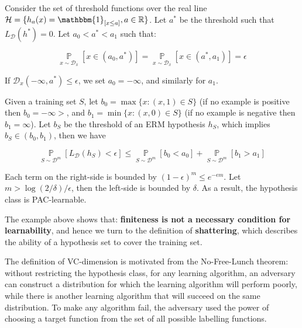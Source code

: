\documentclass{article}
\begin{document}
Consider the set of threshold functions over the real line $\mathcal{H}=\{h_a(x)=\mathbbm{1}_{[x\leq a]},a\in\mathbb{R}\}$. Let $a^*$ be the threshold such that $L_\mathcal{D}(h^*)=0$. Let $a_0<a^*<a_1$ such that:

\begin{equation*}
\mathop{\mathbb{P}}\limits_{x\sim\mathcal{D}_x}[x\in(a_0,a^*)]=\mathop{\mathbb{P}}\limits_{x\sim\mathcal{D}_x}[x\in(a^*,a_1)]=\epsilon
\end{equation*}

If $\mathcal{D}_x(-\infty,a^*)\leq\epsilon$, we set $a_0=-\infty$, and similarly for $a_1$.

Given a training set $S$, let $b_0=\max\{x:(x,1)\in S\}$ (if no example is positive then $b_0=-\infty>$, and $b_1=\min\{x:(x,0)\in S\}$ (if no example is negative then $b_1=\infty$). Let $b_S$ be the threshold of an ERM hypothesis $h_S$, which implies $b_S\in(b_0,b_1)$, then we have

\begin{equation*}
\mathop{\mathbb{P}}\limits_{S\sim\mathcal{D}^m}[L_\mathcal{D}(h_S)<\epsilon]\leq\mathop{\mathbb{P}}\limits_{S\sim\mathcal{D}^m}[b_0<a_0]+\mathop{\mathbb{P}}\limits_{S\sim\mathcal{D}^m}[b_1>a_1]
\end{equation*}

Each term on the right-side is bounded by $(1-\epsilon)^m\leq e^{-\epsilon m}$. Let $m>\log(2/\delta)/\epsilon$, then the left-side is bounded by $\delta$. As a result, the hypothesis class is PAC-learnable.

The example above shows that: \textbf{finiteness is not a necessary condition for learnability}, and hence we turn to the definition of \textbf{shattering}, which describes the ability of a hypothesis set to cover the training set.

The definition of VC-dimension is motivated from the No-Free-Lunch theorem: without restricting the hypothesis class, for any learning algorithm, an adversary can construct a distribution for which the learning algorithm will perform poorly, while there is another learning algorithm that will succeed on the same distribution. To make any algorithm fail, the adversary used the power of choosing a target function from the set of all possible labelling functions.

%
%
%
%
%
%
%
\end{document}

